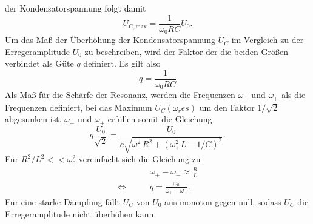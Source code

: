 der Kondensatorspannung folgt damit
\begin{equation*}
    U_{C, \text{max}} = \frac{1}{\omega_0 RC} U_0  .
\end{equation*}
Um das Maß der Überhöhung der Kondensatorspannung $U_C$ im Vergleich zu der Erregeramplitude $U_0$ zu beschreiben, wird der Faktor der die beiden
Größen verbindet als Güte $q$ definiert. Es gilt also
\begin{equation}
    q=\frac{1}{\omega_0RC}
    \label{eqn:gute}
\end{equation}
Als Maß für die Schärfe der Resonanz, werden die Frequenzen $\omega_-$ und $\omega_+$ als die Frequenzen definiert, bei das Maximum $U_C(\omega_res)$
um den Faktor $1/\sqrt{2}$ abgesunken ist. $\omega_-$ und $\omega_+$ erfüllen somit die Gleichung
\begin{equation*}
    q\frac{U_0}{\sqrt{2}}=\frac{U_0}{c\sqrt{\omega_{\pm}^2R^2+(\omega_{\pm}^2L-1/C)^2}} .
\end{equation*}
Für $R^2/L^2<<\omega_0^2$ vereinfacht sich die Gleichung zu
\begin{align*}
                    &\omega_+-\omega_-\approx \frac{R}{L} \\
    \Leftrightarrow \qquad &q=\frac{\omega_0}{\omega_+-\omega_-}    .
\end{align*}
Für eine starke Dämpfung fällt $U_C$ von $U_0$ aus monoton gegen null, sodass $U_C$ die Erregeramplitude nicht überhöhen kann. 